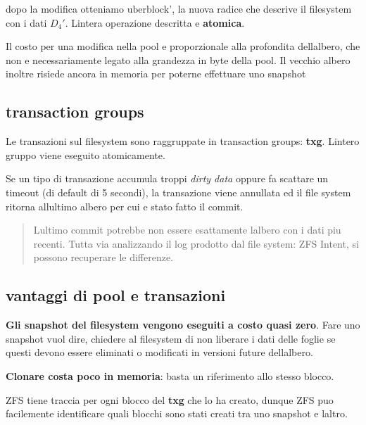 dopo la modifica otteniamo \(\text{uberblock'}\), la nuova radice che
descrive il filesystem con i dati \(D_{4}'\). L\textquotesingle intera
operazione descritta e\textquotesingle{} \textbf{atomica}.

Il costo per una modifica nella pool e\textquotesingle{} proporzionale
alla profondita dell\textquotesingle albero, che non e\textquotesingle{}
necessariamente legato alla grandezza in byte della pool. Il vecchio
albero inoltre risiede ancora in memoria per poterne effettuare uno
snapshot

\subsection{transaction groups}\label{transaction-groups}

Le transazioni sul filesystem sono raggruppate in transaction groups:
\textbf{txg}. L\textquotesingle intero gruppo viene eseguito
atomicamente.

Se un tipo di transazione accumula troppi \emph{dirty data} oppure fa
scattare un timeout (di default di 5 secondi), la transazione viene
annullata ed il file system ritorna all\textquotesingle ultimo albero
per cui e\textquotesingle{} stato fatto il commit.

\begin{quote}
L\textquotesingle ultimo commit potrebbe non essere esattamente
l\textquotesingle albero con i dati piu recenti. Tutta via analizzando
il log prodotto dal file system: ZFS Intent, si possono recuperare le
differenze.
\end{quote}

\subsection{vantaggi di pool e
transazioni}\label{vantaggi-di-pool-e-transazioni}

\textbf{Gli snapshot del filesystem vengono eseguiti a costo quasi
zero}. Fare uno snapshot vuol dire, chiedere al filesystem di non
liberare i dati delle foglie se questi devono essere eliminati o
modificati in versioni future dell\textquotesingle albero.

\textbf{Clonare costa poco in memoria}: basta un riferimento allo stesso
blocco.

ZFS tiene traccia per ogni blocco del \textbf{txg} che lo ha creato,
dunque ZFS puo\textquotesingle{} facilemente identificare quali blocchi
sono stati creati tra uno snapshot e l\textquotesingle altro.

